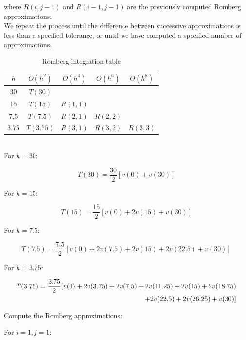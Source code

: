 \documentclass[12pt, a4paper]{article}
\numberwithin{equation}{section}
\begin{document}
where \(R(i, j-1)\) and \(R(i-1, j-1)\) are the previously computed Romberg approximations.\\

We repeat the process until the difference between successive approximations is less than a specified tolerance, or until we have computed a specified number of approximations.\\
\begin{table}[H]
    \centering
    \caption{Romberg integration table}
    \begin{tabular}{c|c|ccc} \hline
        $h$ & $O(h^2)$ & $O(h^4)$ & $O(h^6)$ & $O(h^8)$ \\ \hline
        30 & $T(30)$ & & &  \\
        15 & $T(15)$ & $R(1, 1)$ & &  \\
        7.5 & $T(7.5)$ & $R(2, 1)$ & $R(2, 2)$ &  \\
        3.75 & $T(3.75)$ & $R(3, 1)$ & $R(3, 2)$ & $R(3, 3)$ \\ \hline
    \end{tabular}
    \label{tab:my_label}
\end{table}

\\

For \(h = 30\):

\begin{equation}
T(30) = \frac{30}{2} \left[v(0) + v(30)\right]
\end{equation}

For \(h = 15\):

\begin{equation}
T(15) = \frac{15}{2} \left[v(0) + 2v(15) + v(30)\right]
\end{equation}

For \(h = 7.5\):

\begin{equation}
T(7.5) = \frac{7.5}{2} \left[v(0) + 2v(7.5) + 2v(15) + 2v(22.5) + v(30)\right]
\end{equation}

For \(h = 3.75\):

\begin{align}
T(3.75) = \frac{3.75}{2} [v(0) + 2v(3.75) + 2v(7.5) + 2v(11.25) + 2v(15) + 2v(18.75) \\ \notag
\quad + 2v(22.5) + 2v(26.25) + v(30)]
\end{align}

Compute the Romberg approximations:

For \(i = 1, j = 1\):
\end{document}
